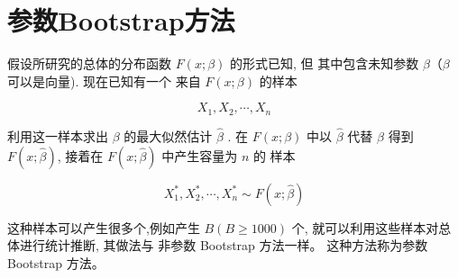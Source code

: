 \section{参数Bootstrap方法}

假设所研究的总体的分布函数 $ F(x ; \beta) $ 的形式已知, 但 其中包含未知参数 $ \beta （ \beta $ 可以是向量). 现在已知有一个 来自 $ F(x ; \beta) $ 的样本

$$ X_{1}, X_{2}, \cdots, X_{n} $$

利用这一样本求出 $ \beta $ 的最大似然估计 $ \hat{\beta} $ . 在 $ F(x ; \beta) $ 中以 $ \hat{\beta} $ 代替 $ \beta $ 得到 $ F(x ; \hat{\beta}) $, 接着在 $ F(x ; \hat{\beta}) $ 中产生容量为 $ n $ 的 样本

$$ X_{1}^{*}, X_{2}^{*}, \cdots, X_{n}^{*} \sim F(x ; \hat{\beta}) $$

这种样本可以产生很多个,例如产生 $ B(B \geq 1000) $ 个, 就可以利用这些样本对总体进行统计推断, 其做法与 非参数 Bootstrap 方法一样。 这种方法称为参数 Bootstrap 方法。 